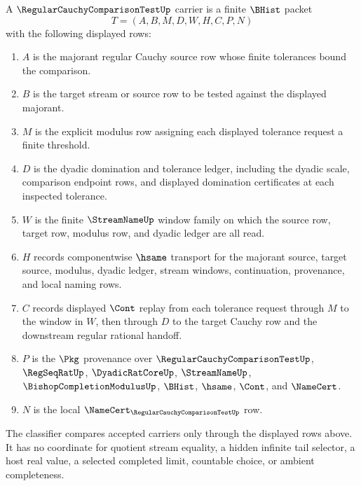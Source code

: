 \begin{definition}
\label{def:regular-cauchy-comparison-test-carrier}
A $\RegularCauchyComparisonTestUp$ carrier is a finite $\BHist$ packet
$$
T=(A,B,M,D,W,H,C,P,N)
$$
with the following displayed rows:
\begin{enumerate}
\item $A$ is the majorant regular Cauchy source row whose finite tolerances bound the comparison.
\item $B$ is the target stream or source row to be tested against the displayed majorant.
\item $M$ is the explicit modulus row assigning each displayed tolerance request a finite threshold.
\item $D$ is the dyadic domination and tolerance ledger, including the dyadic scale, comparison endpoint rows, and displayed domination certificates at each inspected tolerance.
\item $W$ is the finite $\StreamNameUp$ window family on which the source row, target row, modulus row, and dyadic ledger are all read.
\item $H$ records componentwise $\hsame$ transport for the majorant source, target source, modulus, dyadic ledger, stream windows, continuation, provenance, and local naming rows.
\item $C$ records displayed $\Cont$ replay from each tolerance request through $M$ to the window in $W$, then through $D$ to the target Cauchy row and the downstream regular rational handoff.
\item $P$ is the $\Pkg$ provenance over $\RegularCauchyComparisonTestUp$, $\RegSeqRatUp$, $\DyadicRatCoreUp$, $\StreamNameUp$, $\BishopCompletionModulusUp$, $\BHist$, $\hsame$, $\Cont$, and $\NameCert$.
\item $N$ is the local $\NameCert_{\RegularCauchyComparisonTestUp}$ row.
\end{enumerate}
The classifier compares accepted carriers only through the displayed rows above. It has no coordinate for quotient stream equality, a hidden infinite tail selector, a host real value, a selected completed limit, countable choice, or ambient completeness.
\end{definition}

